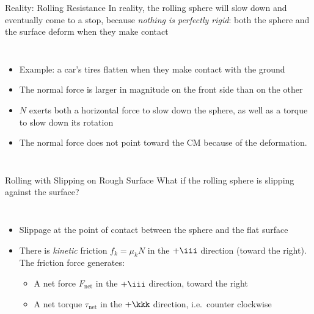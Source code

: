 \documentclass[12pt,compress,aspectratio=169]{beamer}
\begin{document}
\begin{frame}{Reality: Rolling Resistance}
  In reality, the rolling sphere will slow down and eventually come to a stop,
  because \emph{nothing is perfectly rigid}: both the sphere and the surface
  deform when they make contact
  \begin{columns}
    \begin{itemize}
    \item Example: a car's tires flatten when they make contact with the ground
    \item The normal force is larger in magnitude on the front side than on the
      other
    \item $N$ exerts both a horizontal force to slow down the sphere, as well
      as a torque to slow down its rotation
    \item The normal force does not point toward the CM because of the
      deformation.
    \end{itemize}

    \vspace{.3in}
  \end{columns}
\end{frame}




\begin{frame}{Rolling with Slipping on Rough Surface}
  What if the rolling sphere is slipping against the surface?
  \begin{columns}
    \centering

    \begin{itemize}
    \item Slippage at the point of contact between the sphere and the flat
      surface
    \item There is \emph{kinetic} friction $f_k=\mu_kN$ in the $+\iii$
      direction (toward the right). The friction force generates:
      \begin{itemize}
      \item A net force $F_\text{net}$ in the $+\iii$ direction, toward the
        right
      \item A net torque $\tau_\text{net}$ in the $+\kkk$ direction, i.e.\
        counter clockwise
      \end{itemize}
    \end{itemize}
  \end{columns}
\end{frame}
\end{document}
